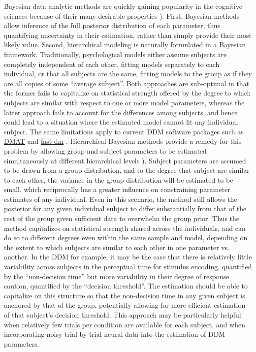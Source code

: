 \documentclass[letterpaper,10pt,english]{article}
\begin{document}
Bayesian data analytic methods are quickly gaining popularity in the cognitive sciences because of their many desirable properties \citep{LeeWagenmakers13,Kruschke10}). First, Bayesian methods allow inference of the full posterior distribution of each parameter, thus quantifying uncertainty in their estimation, rather than simply provide their most likely value. Second, hierarchical modeling is naturally formulated in a Bayesian framework. Traditionally, psychological models either assume subjects are completely independent of each other, fitting models separately to each individual, or that all subjects are the same, fitting models to the group as if they are all copies of some ``average subject''. Both approaches are sub-optimal in that the former fails to capitalize on statistical strength offered by the degree to which subjects are similar with respect to one or more model parameters, whereas the latter approach fails to account for the differences among subjects, and hence could lead to a situation where the estimated model cannot fit any individual subject. The same limitations apply to current DDM software packages such as \href{http://ppw.kuleuven.be/okp/software/dmat/}{DMAT} \citep{VandekerckhoveTuerlinckx08} and \href{http://seehuhn.de/pages/fast-dm}{fast-dm} \citep{VossVoss07}. Hierarchical Bayesian methods provide a remedy for this problem by allowing group and subject parameters to be estimated simultaneously at different hierarchical levels \citep{LeeWagenmakers13,Kruschke10,VandekerckhoveTuerlinckxLee11}). Subject parameters are assumed to be drawn from a group distribution, and to the degree that subject are similar to each other, the variance in the group distribution will be estimated to be small, which reciprocally has a greater influence on constraining parameter estimates of any individual. Even in this scenario, the method still allows the posterior for any given individual subject to differ substantially from that of the rest of the group given sufficient data to overwhelm the group prior. Thus the method capitalizes on statistical strength shared across the individuals, and can do so to different degrees even within the same sample and model, depending on the extent to which subjects are similar to each other in one parameter vs. another. In the DDM for example, it may be the case that there is relatively little variability across subjects in the perceptual time for stimulus encoding, quantified by the ``non-decision time'' but more variability in their degree of response caution, quantified by the ``decision threshold''. The estimation should be able to capitalize on this structure so that the non-decision time in any given subject is anchored by that of the group, potentially allowing for more efficient estimation of that subject's decision threshold. This approach may be particularly helpful when relatively few trials per condition are available for each subject, and when incorporating noisy trial-by-trial neural data into the estimation of DDM parameters.
\end{document}
